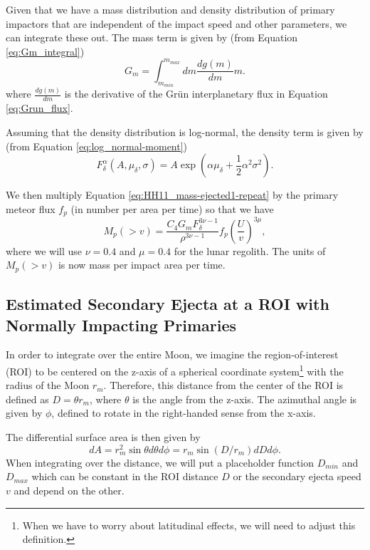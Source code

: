 \documentclass{hitec}
\numberwithin{equation}{section}
\begin{document}
Given that we have a mass distribution and density distribution of primary impactors that are independent of the impact speed and other parameters, we can integrate these out. The mass term is given by (from Equation \eqref{eq:Gm_integral})
\begin{equation}\label{eq:Gm_integral-repeat}
G_m = \int_{m_{min}}^{m_{max}}dm\frac{dg(m)}{dm}m.
\end{equation}
where $\frac{dg(m)}{dm}$ is the derivative of the Gr{\"u}n interplanetary flux in Equation \eqref{eq:Grun_flux}.

Assuming that the density distribution is log-normal, the density term is given by (from Equation \eqref{eq:log_normal-moment})
\begin{equation}\label{eq:log_normal-moment-repeat}
F^\alpha_\delta(A,\mu_\delta,\sigma) = A\exp\left(\alpha\mu_\delta+\frac{1}{2}\alpha^2\sigma^2\right).
\end{equation}

We then multiply Equation \eqref{eq:HH11_mass-ejected1-repeat} by the primary meteor flux $f_p$ (in number per area per time) so that we have
\begin{equation}\label{eq:ejected_mass}
M_p(>v) = \frac{C_4 G_m F_\delta^{3\nu-1}}{\rho^{3\nu-1}}f_p\left(\frac{U}{v}\right)^{3\mu},
\end{equation}
where we will use $\nu = 0.4$ and $\mu = 0.4$ for the lunar regolith. The units of $M_p(>v)$ is now mass per impact area per time.


\subsection{Estimated Secondary Ejecta at a ROI with Normally Impacting Primaries}\label{ssec:EstimatedSecondaryEjectaataROI}
In order to integrate over the entire Moon, we imagine the region-of-interest (ROI) to be centered on the z-axis of a spherical coordinate system\footnote{When we have to worry about latitudinal effects, we will need to adjust this definition.} with the radius of the Moon $r_m$. Therefore, this distance from the center of the ROI is defined as $D = \theta r_m$, where $\theta$ is the angle from the z-axis. The azimuthal angle is given by $\phi$, defined to rotate in the right-handed sense from the x-axis.

The differential surface area is then given by
\begin{equation}
dA = r_m^2\sin\theta d\theta d\phi = r_m\sin(D/r_m)dD d\phi.
\end{equation}
When integrating over the distance, we will put a placeholder function $D_{min}$ and $D_{max}$ which can be constant in the ROI distance $D$ or the secondary ejecta speed $v$ and depend on the other.
\end{document}
